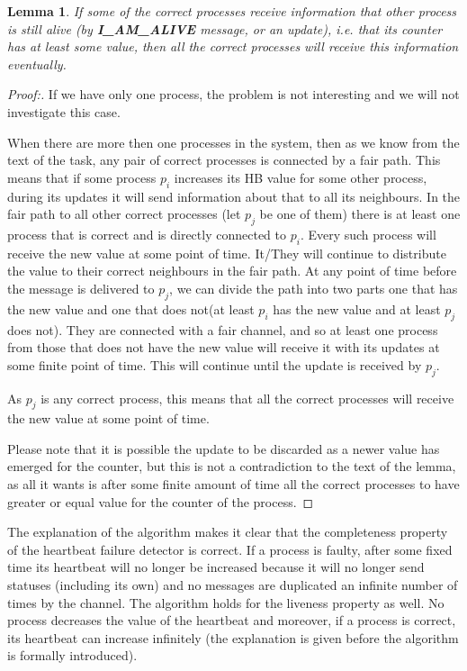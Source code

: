 \documentclass[12pt]{article}
\theoremstyle{plain}
\begin{document}
\newtheorem*{lem1}{Lemma}
\begin{lem1}
  If some of the correct processes receive information that other process is still
  alive (by \textbf{I\_AM\_ALIVE} message, or an update), i.e. that its counter
  has at least some value, then all the correct processes will receive this
  information eventually.
\end{lem1}
\begin{proof}[Proof:]
  If we have only one process, the problem is not interesting and we will not
  investigate this case.
  
  When there are more then one processes in the system, then as we know from the
  text of the task, any pair of correct processes is connected by a fair path.
  This means that if some process $p_i$ increases its HB value for some other
  process, during its updates it will send information about that to all its
  neighbours. In the fair path to all other correct processes (let $p_j$ be 
  one of them) there is at least one process that is correct and is directly
  connected to $p_i$. Every such process will receive the new value at some
  point of time. It/They will continue to distribute the value to their correct
  neighbours in the fair path. At any point of time before the message is
  delivered to $p_j$, we can divide the path into two parts one that has the new
  value and one that does not(at least $p_i$ has the new value and at least
  $p_j$ does not). They are connected with a fair channel, and so at least one
  process from those that does not have the new value will receive it with its
  updates at some finite point of time. This will continue until the update is
  received by $p_j$.  

  As $p_j$ is any correct process, this means that all the correct processes
  will receive the new value at some point of time.

  Please note that it is possible the update to be discarded as a newer value
  has emerged for the counter, but this is not a contradiction to the text of 
  the lemma, as all it wants is after some finite amount of time all the correct
  processes to have greater or equal value for the counter of the process.
\end{proof}
  
The explanation of the algorithm makes it clear that the completeness property
of the heartbeat failure detector is correct. If a process is faulty, after some
fixed time its heartbeat will no longer be increased because it will no longer
send statuses (including its own) and no messages are duplicated an infinite 
number of times by the channel. The algorithm holds for the liveness property
as well. No process decreases the value of the heartbeat and moreover, if a
process is correct, its heartbeat can increase infinitely (the explanation is
given before the algorithm is formally introduced).
\end{document}
